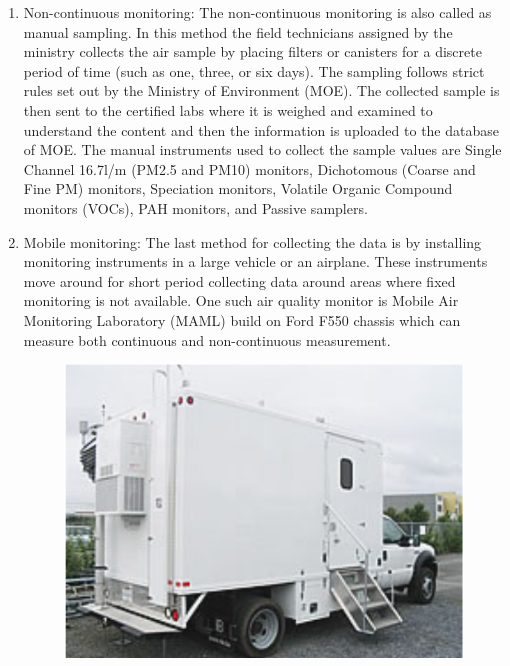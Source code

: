 \begin{enumerate}

  \item Non-continuous monitoring: The non-continuous monitoring is also called as manual sampling. In this method the field technicians assigned by the ministry collects the air sample by placing filters or canisters for a discrete period of time (such as one, three, or six days). The sampling follows strict rules set out by the Ministry of Environment (MOE). The collected sample is then sent to the certified labs where it is weighed and examined to understand the content and then the information is uploaded to the database of MOE. The manual instruments used to collect the sample values are Single Channel 16.7l/m (PM2.5 and PM10) monitors, Dichotomous (Coarse and Fine PM) monitors, Speciation monitors, Volatile Organic Compound monitors (VOCs), PAH monitors, and Passive samplers.
  


  \item Mobile monitoring: The last method for collecting the data is by installing monitoring instruments in a large vehicle or an airplane. These instruments move around for short period collecting data around areas where fixed monitoring is not available. One such air quality monitor is  Mobile Air Monitoring Laboratory (MAML) \cite{MAML} build on Ford F550 chassis which can measure both continuous and non-continuous measurement. 
  
  \vspace{5mm}


  \begin{figure}[h]
    \begin{center}
    \includegraphics[scale= 0.60]{./images/figure38.png}
    \end{center}
   

\end{figure}
\end{enumerate}
